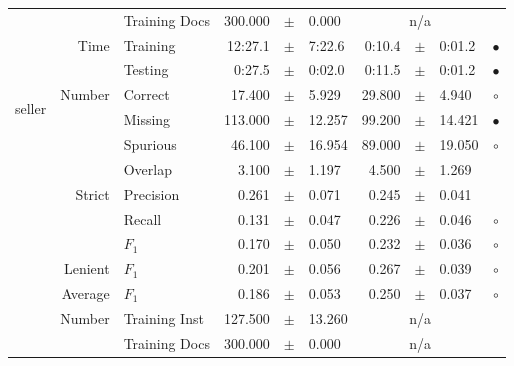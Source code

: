 \begin{longtable}{|r|r|l||rcl|rcl|c|}
\cline{3-10} &                             &   Training Docs &     300.000 &  $\pm$  &       0.000 &    \multicolumn{3}{c|}{n/a}         &  \\
\cline{2-10} & \multirow{2}{*}{      Time} &        Training &     12:27.1 &  $\pm$  &      7:22.6 &      0:10.4 &  $\pm$  &      0:01.2 & $\bullet$ \\
\cline{3-10} &                             &         Testing &      0:27.5 &  $\pm$  &      0:02.0 &      0:11.5 &  $\pm$  &      0:01.2 & $\bullet$ \\
\hline
\hline
\multirow{11}{*}{\begin{sideways}seller\end{sideways} }
             & \multirow{4}{*}{    Number} &         Correct &      17.400 &  $\pm$  &       5.929 &      29.800 &  $\pm$  &       4.940 & $\circ$ \\
\cline{3-10} &                             &         Missing &     113.000 &  $\pm$  &      12.257 &      99.200 &  $\pm$  &      14.421 & $\bullet$ \\
\cline{3-10} &                             &        Spurious &      46.100 &  $\pm$  &      16.954 &      89.000 &  $\pm$  &      19.050 & $\circ$ \\
\cline{3-10} &                             &         Overlap &       3.100 &  $\pm$  &       1.197 &       4.500 &  $\pm$  &       1.269 &  \\
\cline{2-10} & \multirow{3}{*}{    Strict} &       Precision &       0.261 &  $\pm$  &       0.071 &       0.245 &  $\pm$  &       0.041 &  \\
\cline{3-10} &                             &          Recall &       0.131 &  $\pm$  &       0.047 &       0.226 &  $\pm$  &       0.046 & $\circ$ \\
\cline{3-10} &                             &           $F_1$ &       0.170 &  $\pm$  &       0.050 &       0.232 &  $\pm$  &       0.036 & $\circ$ \\
\cline{2-10} &                     Lenient &           $F_1$ &       0.201 &  $\pm$  &       0.056 &       0.267 &  $\pm$  &       0.039 & $\circ$ \\
\cline{2-10} &                     Average &           $F_1$ &       0.186 &  $\pm$  &       0.053 &       0.250 &  $\pm$  &       0.037 & $\circ$ \\
\cline{2-10} & \multirow{2}{*}{    Number} &   Training Inst &     127.500 &  $\pm$  &      13.260 &    \multicolumn{3}{c|}{n/a}         &  \\
\cline{3-10} &                             &   Training Docs &     300.000 &  $\pm$  &       0.000 &    \multicolumn{3}{c|}{n/a}         &  \\

\end{longtable}

